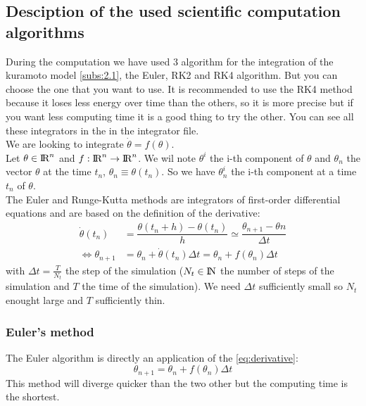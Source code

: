 \documentclass[1pt, a4paper]{article}
\begin{document}
\subsection{Desciption of the used scientific computation algorithms}
\label{subs:2.2}
During the computation we have used 3 algorithm for the integration of the kuramoto model \ref{subs:2.1}, the Euler, RK2 and RK4 algorithm. But you can choose the one that you want to use. It is recommended to use the RK4 method because it loses less energy over time than the others, so it is more precise but if you want less computing time it is a good thing to try the other. You can see all these integrators in the  in the integrator file.\\
We are looking to integrate $\dot{\theta} = f(\theta)$.\\
Let $\theta\in\mbox{I\hspace{-.15em}R}^n$ and $f:\mbox{I\hspace{-.15em}R}^n  \rightarrow  \mbox{I\hspace{-.15em}R}^n$. We wil note $\theta^i$ the i-th component of $\theta$ and $\theta_n$ the vector $\theta$ at the time $t_n$, $\theta_n \equiv \theta(t_n)$. So we have $\theta^i_n$ the i-th component at a time $t_n$ of $\theta$.\\
The Euler and Runge-Kutta methods are integrators of first-order differential equations and are based on the definition of the derivative:
\begin{equation}
\label{eq:derivative}
    \begin{aligned}
        \dot{\theta}(t_n) &= \dfrac{\theta(t_n + h) - \theta(t_n)}{h}\simeq\dfrac{\theta_{n+1} - \theta{n}}{\Delta t}\\
        \iff \theta_{n+1} &= \theta_n + \dot{\theta}(t_n)\Delta t = \theta_n + f(\theta_n)\Delta t
    \end{aligned}
\end{equation}
with $\Delta t = \frac{T}{N_t}$ the step of the simulation ($N_t\in\mbox{I\hspace{-.15em}N}$ the number of steps of the simulation and $T$ the time of the simulation). We need $\Delta t$ sufficiently small so $N_t$ enought large and $T$ sufficiently thin.
\subsubsection{Euler's method}
\label{subsubs:Euler}
The Euler algorithm is directly an application of the \autoref{eq:derivative}:
\begin{equation}
    \theta_{n+1} = \theta_n + f(\theta_n)\Delta t
\end{equation}
This method will diverge quicker than the two other but the computing time is the shortest.
\newpage
\end{document}
